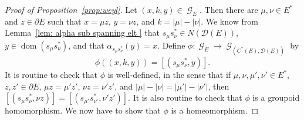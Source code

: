 \documentclass[12pt, a4paper]{amsart}
\numberwithin{equation}{section}
\theoremstyle{definition}
\theoremstyle{remark}
\begin{document}
\begin{proof}[Proof of Proposition~\ref{prop:weyl}]
Let $(x,k,y)\in{\operatorname{\mathcal{G}}}_E$. Then there are $\mu,\nu\in E^*$ and $z\in\partial E$ 
such that $x=\mu z$, $y=\nu z$, and $k=|\mu|-|\nu|$. We know from 
Lemma~\ref{lem: alpha sub spanning elt } that $s_\mu s_\nu^*\in 
N(\mathcal{D}(E))$, $y\in{{\operatorname{dom}}}(s_\mu s_\nu^*)$, and that 
$\alpha_{s_\mu s_\nu^*}(y)=x$. Define 
$\phi:{\operatorname{\mathcal{G}}}_E\to{\operatorname{\mathcal{G}}}_{(C^*(E),\mathcal{D}(E))}$ by 
\[
\phi((x,k,y))=[(s_\mu s_\nu^*,y)].
\]
It is routine to check that $\phi$ is well-defined, in the sense that if 
$\mu,\nu,\mu',\nu'\in E^*$, $z,z'\in\partial E$, $\mu z=\mu' z'$, $\nu z=\nu' 
z'$, and $|\mu|-|\nu|=|\mu'|-|\nu'|$, then $[(s_\mu s_\nu^*, \nu 
z)]=[(s_{\mu'} s_{\nu'}^*,\nu' z')]$. It is also routine to check that 
$\phi$ is a groupoid homomorphism. We now have to show that $\phi$ is a 
homeomorphism.
	

\end{proof}
\end{document}
